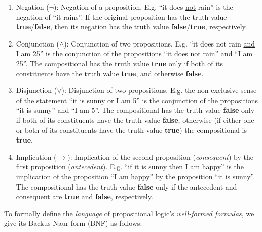 \documentclass{article}
\newcommand{\imp}{\ensuremath{\rightarrow}}
\newcommand{\true}{\textbf{true}}
\newcommand{\false}{\textbf{false}}
\begin{document}
\begin{enumerate}
	\item Negation ($\neg$): Negation of a proposition. E.g.
		``it does \underline{not} rain'' is the negation of ``it rains''.
		If the original proposition has the truth value
		\true{}/\false{}, then its negation has the truth value
		\false{}/\true{}, respectively.
	\item Conjunction ($\land$): Conjunction of two propositions. E.g.
		``it does not rain \underline{and} I am 25'' is the conjunction of
		the propositions ``it does not rain'' and ``I am 25''. The
		compositional has the truth value \true{} only if both of its
		constituents have the truth value \true{}, and otherwise \false{}.
	\item Disjunction ($\lor$): Disjunction of two propositions. E.g.
		the non-exclusive sense of the statement
		``it is sunny \underline{or} I am 5'' is the conjunction of the propositions
		``it is sunny'' and ``I am 5''. The compositional has the truth
		value \false{} only if both of its constituents have the truth
		value \false{}, otherwise (if either one or both of its constituents
		have the truth value \true{}) the compositional is \true{}.
	\item Implication ($\imp$): Implication of the second proposition
		(\textit{consequent}) by the first proposition (\textit{antecedent}).
		E.g. ``\underline{if} it is sunny \underline{then} I am happy'' is the
		implication of the proposition ``I am happy'' by the proposition
		``it is sunny''. The compositional has the truth value \false{} only
		if the antecedent and consequent are \true{} and \false{}, respectively.
\end{enumerate}

To formally define the \textit{language} of propositional logic's
\textit{well-formed formulas}, we give its Backus Naur form (BNF)
as follows:
\begin{bnf*}
	\bnfprod{$\phi$}
	{
		 \bnfor
		\bnfts{$\Big(\neg$} \bnfpn{$\phi$} \bnfts{$\Big)$} \bnfor
		\bnfts{$\Big($} \bnfpn{$\phi$} \bnfts{$\land$}
			\bnfpn{$\phi$} \bnfts{$\Big)$} \bnfor
		\bnfts{$\Big($} \bnfpn{$\phi$} \bnfts{$\lor$}
			\bnfpn{$\phi$} \bnfts{$\Big)$} \bnfor
		\bnfts{$\Big($} \bnfpn{$\phi$} \bnfts{$\imp$}
			\bnfpn{$\phi$} \bnfts{$\Big)$}
	}\\
	{
		 \bnfor {} \bnfor {} \bnfor
		\bnfts{\bnfsk} \bnfor
		 \bnfor {} \bnfor \bnfts{\bnfsk}
	}
\end{bnf*}
\end{document}
